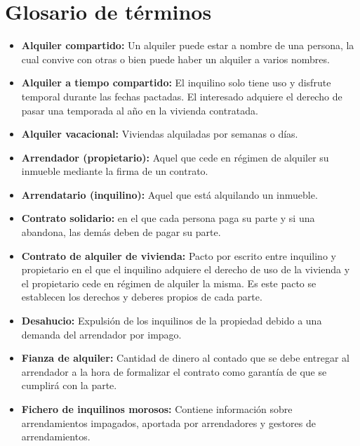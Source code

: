 \chapter{Glosario de términos}

\begin{itemize}

\item \textbf{Alquiler compartido:} Un alquiler puede estar a nombre de una persona, la cual convive con otras o bien puede haber un alquiler a varios nombres. 

\item \textbf{Alquiler a tiempo compartido:} El inquilino solo tiene uso y disfrute temporal durante las fechas pactadas. El interesado adquiere el derecho de pasar una temporada al año en la vivienda contratada.

\item \textbf{Alquiler vacacional:}
Viviendas alquiladas por semanas o días.

\item \textbf{Arrendador (propietario):} Aquel que cede en régimen de alquiler su inmueble mediante la firma de un contrato. 

\item \textbf{Arrendatario (inquilino):} Aquel que está alquilando un inmueble.

\item \textbf{Contrato solidario:} en el que cada persona paga su parte y si una abandona, las demás deben de pagar su parte.

\item \textbf{Contrato de alquiler de vivienda:} Pacto por escrito entre inquilino y propietario en el que el inquilino adquiere el derecho de uso de la vivienda y el propietario cede en régimen de alquiler la misma. Es este pacto se establecen los derechos y deberes propios de cada parte.

\item \textbf{Desahucio:} Expulsión de los inquilinos de la propiedad debido a una demanda del arrendador por impago.

\item \textbf{Fianza de alquiler:} Cantidad de dinero al contado que se debe entregar al arrendador a la hora de formalizar el contrato como garantía de que se cumplirá con la parte.

\item \textbf{Fichero de inquilinos morosos:} Contiene información sobre arrendamientos impagados, aportada por arrendadores y gestores de arrendamientos.


\end{itemize}
